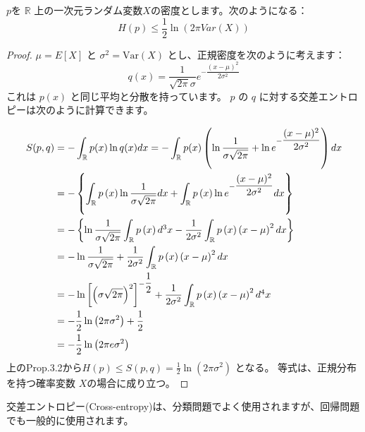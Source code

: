 \documentclass[a4paper]{jsarticle}%
\begin{document}
\begin{cor}
  $p$を $\mathbb{R}$ 上の一次元ランダム変数$X$の密度とします。次のようになる：
\[ 
H(p) \leq \frac{1}{2} \ln(2\pi Var(X))
\]

\begin{proof}
  $\mu = E[X]$ と $\sigma^2 = \text{Var}(X) $ とし、正規密度を次のように考えます：
\[ q(x) = \frac{1}{\sqrt{2\pi}\sigma} e^{-\dfrac{(x - \mu)^2}{2\sigma^2}} \]
これは $p(x)$  と同じ平均と分散を持っています。 $p$  の $q$ に対する交差エントロピーは次のように計算できます。

\begin{align*}
  S(p, q) &= -\int_{\mathbb{R}} p(x) \ln q(x) dx = -\int_{\mathbb{R}}p(x)\left(\ln\dfrac{1}{\sigma \sqrt{2\pi}} + \ln e^{-\dfrac{(x - \mu)^2}{2\sigma^2}}\right)dx\\
  &= -\left\{\int_{\mathbb{R}}p\left(x\right)\ln \dfrac{1}{\sigma \sqrt{2\pi}} dx + \int_{\mathbb{R}}p \left(x\right)\ln e^{-\dfrac{(x - \mu)^2}{2\sigma^2}} dx\right\}\\
  &= -\left\{\ln \dfrac{1}{\sigma \sqrt{2\pi}}\int_{\mathbb{R}}p \left(x\right)d\footnotemark[3] x -\dfrac{1}{2\sigma^2}\int_{\mathbb{R}}p \left(x\right) \left(x-\mu\right)^2 dx\right\}\\
  &= -\ln \dfrac{1}{\sigma \sqrt{2\pi}} + \dfrac{1}{2\sigma^2}\int_{\mathbb{R}}p \left(x\right) \left(x-\mu\right)^2 dx\\
  &= -\ln \left[\left(\sigma \sqrt{2\pi}\right)^2\right]^{-\dfrac{1}{2}} + \dfrac{1}{2\sigma^2}\int_{\mathbb{R}}p \left(x\right) \left(x-\mu\right)^2 d\footnotemark[4] x\\
  &= -\dfrac{1}{2}\ln \left(2\pi\sigma^2\right)+ \dfrac{1}{2}\\
  &= -\dfrac{1}{2}\ln \left(2\pi e\sigma^2\right)
\end{align*}
上のProp.3.2から$H(p) \leq S(p, q) = \frac{1}{2} \ln(2\pi\sigma^2)$ となる。
等式は、正規分布を持つ確率変数 $ X $の場合に成り立つ。
\end{proof}
\end{cor}

\begin{rem}
  交差エントロピー(Cross-entropy)は、分類問題でよく使用されますが、回帰問題でも一般的に使用されます。
\end{rem}
\end{document}
